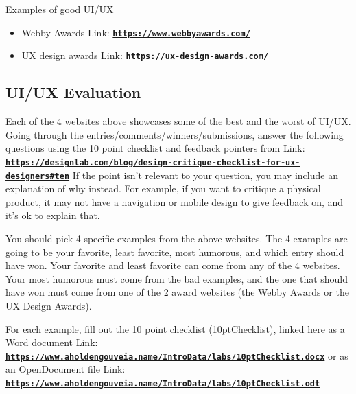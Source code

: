 \documentclass[12pt]{article}
\begin{document}
Examples of good UI/UX
\begin{itemize}
    \item Webby Awards Link: \href{https://www.webbyawards.com/}{\textbf{\nolinkurl{https://www.webbyawards.com/}}}
    \item UX design awards Link: \href{https://ux-design-awards.com/}{\textbf{\nolinkurl{https://ux-design-awards.com/}}}
\end{itemize}


\subsection*{UI/UX Evaluation}
Each of the 4 websites above showcases some of the best and the worst of UI/UX. Going through the entries/comments/winners/submissions, answer the following questions using the 10 point checklist and feedback pointers from Link: \href{https://designlab.com/blog/design-critique-checklist-for-ux-designers#ten}{\textbf{\nolinkurl{https://designlab.com/blog/design-critique-checklist-for-ux-designers\#ten}}} If the point isn't relevant to your question, you may include an explanation of why instead. For example, if you want to critique a physical product, it may not have a navigation or mobile design to give feedback on, and it's ok to explain that.

You should pick 4 specific examples from the above websites.  The 4 examples are going to be your favorite, least favorite, most humorous, and which entry should have won. Your favorite and least favorite can come from any of the 4 websites. Your most humorous must come from the bad examples, and the one that should have won must come from one of the 2 award websites (the Webby Awards or the UX Design Awards).

For each example, fill out the 10 point checklist (10ptChecklist), linked here as a Word document Link: \href{https://www.aholdengouveia.name/IntroData/labs/10ptChecklist.docx}{\textbf{\nolinkurl{https://www.aholdengouveia.name/IntroData/labs/10ptChecklist.docx}}} or as an OpenDocument file Link: \href{https://www.aholdengouveia.name/IntroData/labs/10ptChecklist.odt}{\textbf{\nolinkurl{https://www.aholdengouveia.name/IntroData/labs/10ptChecklist.odt}}}
\end{document}
